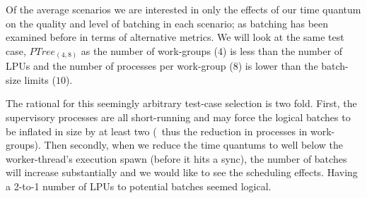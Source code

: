 Of the average scenarios we are interested in only the effects of our time quantum
on the quality and level of batching in each scenario; as batching has been examined 
before in terms of alternative metrics. We will look at the same test case, 
$PTree_{(4,8)}$ as the number of work-groups ($4$) is less than the number of LPUs 
and the number of processes per work-group ($8$) is lower than the batch-size limits 
($10$). 

The rational for this seemingly arbitrary test-case selection is two fold. First,
the supervisory processes are all short-running and may force the logical batches 
to be inflated in size by at least two (\ie~thus the reduction in processes in 
work-groups). Then secondly, when we reduce the time quantums to well below the
worker-thread's execution spawn (before it hits a sync), the number of batches
will increase substantially and we would like to see the scheduling effects. Having
a 2-to-1 number of LPUs to potential batches seemed logical.

